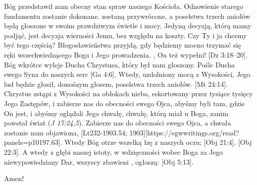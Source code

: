 Bóg przedstawił nam obecny stan spraw naszego Kościoła. Odnowienie starego fundamentu zostanie dokonane.  zostaną przywrócone, a poselstwa trzech aniołów będą głoszone w swoim prawdziwym świetle i mocy. Jedyną decyzją, którą mamy podjąć, jest decyzja wierności Jemu, bez względu na koszty. Czy Ty i ja chcemy być tego częścią? Błogosławieństwa przyjdą, gdy będziemy mocno trzymać się ręki wszechwiedzącego Boga i Jego prowadzenia. , On też wypełni! [Dz 3:18--20]. Bóg wkrótce wyleje Ducha Chrystusa, który był nam głoszony. Pośle Ducha swego Syna do naszych serc [Ga 4:6]. Wtedy, uzdolniony mocą z Wysokości, Jego lud będzie głosił, donośnym głosem, poselstwa trzech aniołów. [Mt 24:14]. Chrystus zstąpi z Wysokości na obłokach nieba, eskortowany przez tysiące tysięcy Jego Zastępów, i zabierze nas do obecności swego Ojca, abyśmy byli tam, gdzie On jest, i abyśmy oglądali Jego chwałę, chwałę, którą miał u Boga, zanim powstał świat (\textit{J 17:24,5}). Zabierze nas do obecności swego Ojca, a chwała zostanie nam objawiona, [Lt232-1903.54; 1903][https://egwwritings.org/read?panels=p10197.63]. Wtedy Bóg otrze wszelką łzę z naszych oczu; [Obj 21:4]. [Obj 22:3]. A wtedy z głębi naszej istoty, w wdzięczności wobec Boga za Jego niewypowiedziany Dar, wszyscy zbawieni , ogłoszą: [Obj 5:13].

Amen!

